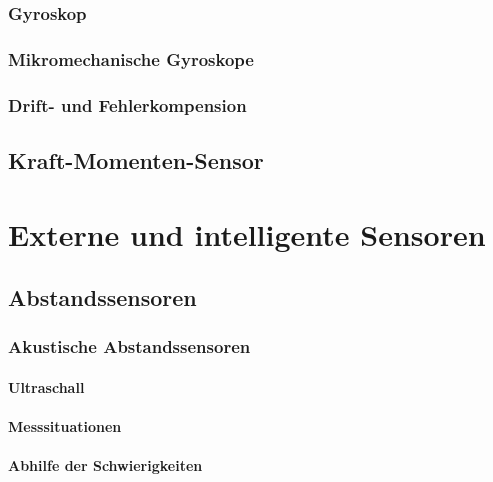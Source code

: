 \documentclass[a4paper, 11pt, accentcolor = tud3b]{tudreport}
\begin{document}
				\subsubsection{Gyroskop} %

				\subsubsection{Mikromechanische Gyroskope} %

				\subsubsection{Drift- und Fehlerkompension} %

			\subsection{Kraft-Momenten-Sensor} %

		\section{Externe und intelligente Sensoren} %

			\subsection{Abstandssensoren} %

				\subsubsection{Akustische Abstandssensoren} %

					\paragraph{Ultraschall} %

					\paragraph{Messsituationen} %

					\paragraph{Abhilfe der Schwierigkeiten} %
\end{document}
